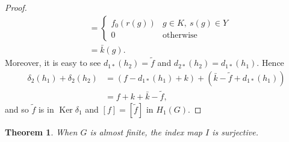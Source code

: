 \documentclass[11pt]{article}
\newtheorem{thm}{Theorem}[section]
\theoremstyle{definition}
\renewcommand{\ker}{\operatorname{Ker}}
\begin{document}
\begin{proof}
\begin{align*}
&=\begin{cases}f_0(r(g)) & g\in K,\ s(g)\in Y \\
0 & \text{otherwise}\end{cases} \\
&=\bar{k}(g). 
\end{align*}
Moreover, it is easy to see 
$d_{1*}(h_2)=\tilde f$ and $d_{2*}(h_2)=d_{1*}(h_1)$. 
Hence 
\begin{align*}
\delta_2(h_1)+\delta_2(h_2)
&=(f-d_{1*}(h_1)+k)+(\bar{k}-\tilde f+d_{1*}(h_1)) \\
&=f+k+\bar{k}-\tilde f, 
\end{align*}
and so $\tilde f$ is in $\ker\delta_1$ and $[f]=[\tilde f]$ in $H_1(G)$. 
\end{proof}

\begin{thm}\label{surjective}
When $G$ is almost finite, the index map $I$ is surjective. 
\end{thm}
\end{document}
